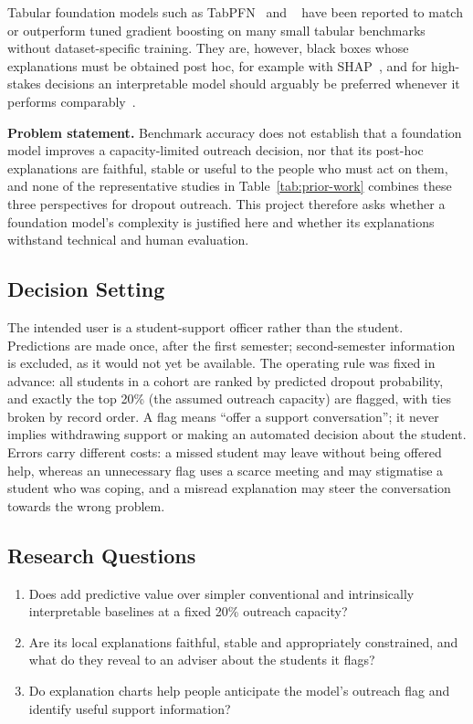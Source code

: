 Tabular foundation models such as TabPFN~\citep{hollmann2025tabpfn} and
\tabicl~\citep{qu2025tabicl} have been reported to match or outperform tuned gradient boosting on
many small tabular benchmarks without dataset-specific training. They are, however, black boxes
whose explanations must be obtained post hoc, for example with SHAP~\citep{lundberg2017shap}, and
for high-stakes decisions an interpretable model should arguably be preferred whenever it performs
comparably~\citep{rudin2019stop}.

\textbf{Problem statement.} Benchmark accuracy does not establish that a foundation model improves a
capacity-limited outreach decision, nor that its post-hoc explanations are faithful, stable or
useful to the people who must act on them, and none of the representative studies in
Table~\ref{tab:prior-work} combines these three perspectives for dropout outreach. This project
therefore asks whether a foundation model's complexity is justified here and whether its
explanations withstand technical and human evaluation.

\subsection{Decision Setting}

The intended user is a student-support officer rather than the student. Predictions are made once,
after the first semester; second-semester information is excluded, as it would not yet be
available. The operating rule was fixed in advance: all students in a cohort are ranked by
predicted dropout probability, and exactly the top 20\% (the assumed outreach capacity) are flagged,
with ties broken by record order. A flag means ``offer a support conversation''; it never implies
withdrawing support or making an automated decision about the student. Errors carry different
costs: a missed student may leave without being offered help, whereas an unnecessary flag uses a
scarce meeting and may stigmatise a student who was coping, and a misread explanation may steer the
conversation towards the wrong problem.

\subsection{Research Questions}

\begin{enumerate}[nosep,leftmargin=*]
  \item[\textbf{RQ1.}] Does \tabicl add predictive value over simpler conventional and
  intrinsically interpretable baselines at a fixed 20\% outreach capacity?
  \item[\textbf{RQ2.}] Are its local explanations faithful, stable and appropriately constrained,
  and what do they reveal to an adviser about the students it flags?
  \item[\textbf{RQ3.}] Do explanation charts help people anticipate the model's outreach flag and
  identify useful support information?
\end{enumerate}


